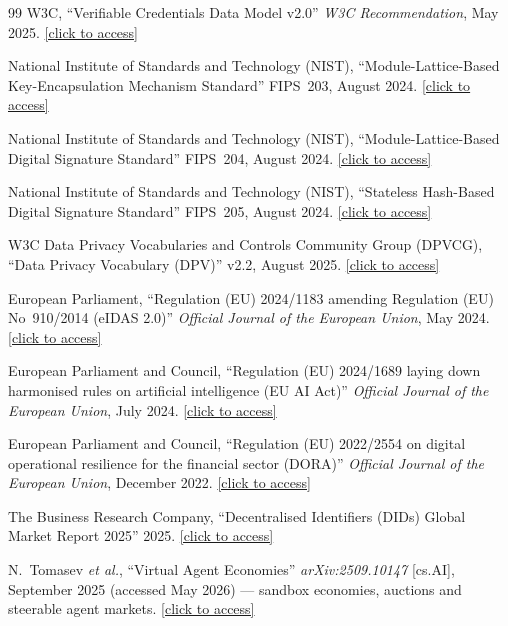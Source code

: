\documentclass[12pt,a4paper]{article}
\begin{document}
\begin{thebibliography}{99}
W3C, ``Verifiable Credentials Data Model v2.0'' \textit{W3C Recommendation}, May 2025. \href{https://www.w3.org/TR/vc-data-model-2.0/}{[click to access]}

National Institute of Standards and Technology (NIST), ``Module-Lattice-Based Key-Encapsulation Mechanism Standard'' FIPS~203, August 2024. \href{https://doi.org/10.6028/NIST.FIPS.203}{[click to access]}

National Institute of Standards and Technology (NIST), ``Module-Lattice-Based Digital Signature Standard'' FIPS~204, August 2024. \href{https://doi.org/10.6028/NIST.FIPS.204}{[click to access]}

National Institute of Standards and Technology (NIST), ``Stateless Hash-Based Digital Signature Standard'' FIPS~205, August 2024. \href{https://doi.org/10.6028/NIST.FIPS.205}{[click to access]}

W3C Data Privacy Vocabularies and Controls Community Group (DPVCG), ``Data Privacy Vocabulary (DPV)'' v2.2, August 2025. \href{https://w3id.org/dpv}{[click to access]}

European Parliament, ``Regulation (EU) 2024/1183 amending Regulation (EU) No~910/2014 (eIDAS 2.0)'' \textit{Official Journal of the European Union}, May 2024. \href{https://eur-lex.europa.eu/legal-content/EN/TXT/?uri=OJ:L_202401183}{[click to access]}

European Parliament and Council, ``Regulation (EU) 2024/1689 laying down harmonised rules on artificial intelligence (EU AI Act)'' \textit{Official Journal of the European Union}, July 2024. \href{https://eur-lex.europa.eu/legal-content/EN/TXT/?uri=OJ:L_202401689}{[click to access]}

European Parliament and Council, ``Regulation (EU) 2022/2554 on digital operational resilience for the financial sector (DORA)'' \textit{Official Journal of the European Union}, December 2022. \href{https://eur-lex.europa.eu/legal-content/EN/TXT/?uri=CELEX:32022R2554}{[click to access]}

The Business Research Company, ``Decentralised Identifiers (DIDs) Global Market Report 2025'' 2025. \href{https://www.thebusinessresearchcompany.com/}{[click to access]}

N.~Tomasev \textit{et al.}, ``Virtual Agent Economies'' \textit{arXiv:2509.10147} [cs.AI], September 2025 (accessed May 2026) — sandbox economies, auctions and steerable agent markets. \href{https://arxiv.org/abs/2509.10147}{[click to access]}


\end{thebibliography}
\end{document}

